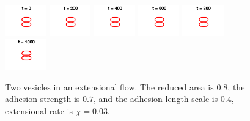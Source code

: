\documentclass[aps,prl,twocolumn,showpacs,amsmath,amssymb]{revtex4-1}
\begin{document}
\begin{figure}[htp]
  \includegraphics[width = 0.16\textwidth]{figs/extensional_adR4em1adS7em1Chi3em2_ra080_image01.png}
  \includegraphics[width = 0.16\textwidth]{figs/extensional_adR4em1adS7em1Chi3em2_ra080_image02.png}
  \includegraphics[width = 0.16\textwidth]{figs/extensional_adR4em1adS7em1Chi3em2_ra080_image03.png}
  \includegraphics[width = 0.16\textwidth]{figs/extensional_adR4em1adS7em1Chi3em2_ra080_image04.png}
  \includegraphics[width = 0.16\textwidth]{figs/extensional_adR4em1adS7em1Chi3em2_ra080_image05.png}
  \includegraphics[width = 0.16\textwidth]{figs/extensional_adR4em1adS7em1Chi3em2_ra080_image06.png}
  \caption{Two vesicles in an extensional flow.  The reduced area is
  $0.8$, the adhesion strength is $0.7$, and the adhesion length scale
is $0.4$, extensional rate is $\chi = 0.03$.}
\end{figure}
\end{document}
